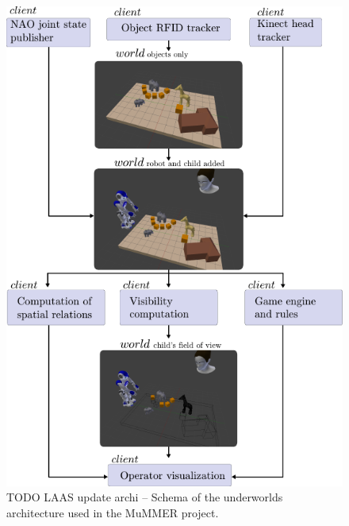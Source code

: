 \documentclass[letterpaper, 10pt, conference]{ieeeconf}
\newcommand{\uwds}{{\sc underworlds}\xspace}
\begin{document}
\begin{figure}
    \centering
    \includegraphics[width=0.9\linewidth]{l2tor}
    \caption{TODO LAAS update archi -- Schema of the \uwds architecture used in
    the MuMMER project. }
    \label{fig|mummerarchitecture}
\end{figure}
\end{document}
